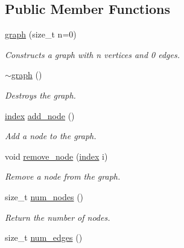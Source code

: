 \subsection*{Public Member Functions}
\begin{DoxyCompactItemize}
\item 
\hyperlink{classmerlin_1_1graph_aa01a823270b0fb2edbc2cd6622e961fe}{graph} (size\+\_\+t n=0)
\begin{DoxyCompactList}\small\item\em Constructs a graph with {\itshape n} vertices and 0 edges. \end{DoxyCompactList}\item 
\hypertarget{classmerlin_1_1graph_a6c24adfdbf5091e0adea5c2bf551debc}{}\hyperlink{classmerlin_1_1graph_a6c24adfdbf5091e0adea5c2bf551debc}{$\sim$graph} ()\label{classmerlin_1_1graph_a6c24adfdbf5091e0adea5c2bf551debc}

\begin{DoxyCompactList}\small\item\em Destroys the graph. \end{DoxyCompactList}\item 
\hyperlink{classmerlin_1_1graph_a5cade38832f47248573e921276f122d6}{index} \hyperlink{classmerlin_1_1graph_a844faa05514a364e89c53cef10e59a9b}{add\+\_\+node} ()
\begin{DoxyCompactList}\small\item\em Add a node to the graph. \end{DoxyCompactList}\item 
void \hyperlink{classmerlin_1_1graph_a33a6ba0779fcd5a432eb0e9fade5113e}{remove\+\_\+node} (\hyperlink{classmerlin_1_1graph_a5cade38832f47248573e921276f122d6}{index} i)
\begin{DoxyCompactList}\small\item\em Remove a node from the graph. \end{DoxyCompactList}\item 
\hypertarget{classmerlin_1_1graph_a068fcb26500eccd201a6ca877d76fafe}{}size\+\_\+t \hyperlink{classmerlin_1_1graph_a068fcb26500eccd201a6ca877d76fafe}{num\+\_\+nodes} ()\label{classmerlin_1_1graph_a068fcb26500eccd201a6ca877d76fafe}

\begin{DoxyCompactList}\small\item\em Return the number of nodes. \end{DoxyCompactList}\item 
\hypertarget{classmerlin_1_1graph_a2d2debc5137f505ce83009067d125b5d}{}size\+\_\+t \hyperlink{classmerlin_1_1graph_a2d2debc5137f505ce83009067d125b5d}{num\+\_\+edges} ()\label{classmerlin_1_1graph_a2d2debc5137f505ce83009067d125b5d}


\end{DoxyCompactItemize}
